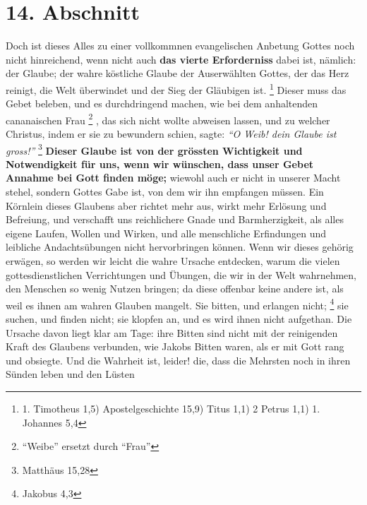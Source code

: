 \section{14. Abschnitt} \label{kap6_ab14}

Doch ist dieses Alles zu einer vollkommnen evangelischen Anbetung Gottes noch
nicht hinreichend, wenn nicht auch \textbf{das vierte Erforderniss} dabei ist,
nämlich:
der Glaube; der wahre köstliche Glaube der Auserwählten Gottes, der das Herz
reinigt, die Welt überwindet und der Sieg der Gläubigen ist.
\footnote{1. Timotheus 1,5) Apostelgeschichte 15,9) Titus 1,1) 2 Petrus 1,1) 1.
Johannes 5,4}
Dieser muss das
Gebet beleben, und es durchdringend machen, wie bei dem anhaltenden cananaischen
Frau \footnote{"`Weibe"' ersetzt durch "`Frau"'}   , das sich
nicht wollte abweisen lassen, und zu welcher Christus, indem er
sie zu bewundern schien, sagte:
\textit{"`O Weib! dein Glaube ist gross!"'}
\footnote{Matthäus 15,28}
\textbf{Dieser Glaube ist von der grössten
Wichtigkeit
und Notwendigkeit für uns, wenn wir wünschen, dass unser Gebet Annahme bei Gott
finden möge;} wiewohl auch er nicht in unserer Macht stehel, sondern Gottes Gabe
ist, von dem wir ihn empfangen müssen. Ein Körnlein dieses Glaubens aber richtet
mehr aus, wirkt mehr Erlösung und Befreiung, und verschafft uns
reichlichere
Gnade und Barmherzigkeit, als alles eigene Laufen, Wollen und Wirken, und alle
menschliche Erfindungen und leibliche Andachtsübungen nicht hervorbringen
können. Wenn wir dieses gehörig erwägen, so werden wir leicht die wahre Ursache
entdecken, warum die vielen gottesdienstlichen Verrichtungen und Übungen, die
wir in der Welt wahrnehmen, den Menschen so wenig Nutzen bringen; da diese
offenbar keine andere ist, als weil es ihnen am wahren Glauben mangelt. Sie
bitten, und erlangen nicht;
\footnote{Jakobus 4,3}
sie suchen, und finden nicht; sie
klopfen an, und es wird ihnen nicht aufgethan. Die Ursache davon liegt klar am
Tage: ihre Bitten sind nicht mit der reinigenden Kraft des Glaubens verbunden,
wie Jakobs  Bitten waren, als er mit Gott rang und
obsiegte. Und die Wahrheit
ist, leider! die, dass die Mehrsten noch in ihren Sünden leben und den Lüsten
